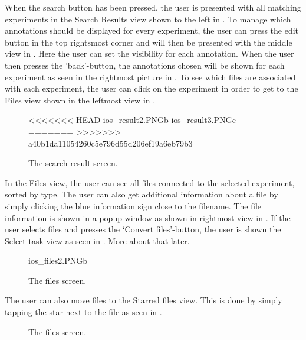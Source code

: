 When the search button has been pressed, the user is presented with all matching experiments in the Search Results view shown to the left in . To manage which annotations should be displayed for every experiment, the user can press the edit button in the top rightsmost corner and will then be presented with the middle view in . Here the user can set the visibility for each annotation. When the user then presses the ’back’-button, the annotations chosen will be shown for each experiment as seen in the rightmost picture in . To see which files are associated with each experiment, the user can click on the experiment in order to get to the Files view shown in the leftmost view in .

\begin{figure}[ht]

<<<<<<< HEAD
		{ios_result2.PNG}{b}
		{ios_result3.PNG}{c}
=======
>>>>>>> a40b1da11054260c5e796d55d206ef19a6eb79b3
\caption{The search result screen.}
\label{fig:ios_searchResult}
\end{figure}
\FloatBarrier
In the Files view, the user can see all files connected to the selected experiment, sorted by type. The user can also get additional information about a file by simply clicking the blue information sign close to the filename. The file information is shown in a popup window as shown in rightmost view in . If the user selects files and presses the ‘Convert files’-button, the user is shown the Select task view as seen in . More about that later.

\begin{figure}[htb]
		{ios_files2.PNG}{b}

\caption{The files screen.}
\label{fig:ios_files1}
\end{figure}
\FloatBarrier
The user can also move files to the Starred files view. This is done by simply tapping the star next to the file as seen in .

\begin{figure}[htb]
\caption{The files screen.}
\label{fig:ios_files3}
\end{figure}
\FloatBarrier

